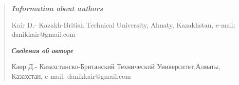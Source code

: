 \begin{quote}
\emph{\textbf{Information about authors}}

Kair D.- Kazakh-British Technical University, Almaty, Kazakhstan,
e-mail: danikkair@gmail.com

\emph{\textbf{Сведения об авторе}}

\emph{\textbf{\hfill\break
}}Каир Д.- Казахстанско-Британский Технический Университет,Алматы,
Казахстан, e-mail: danikkair@gmail.com
\end{quote}
